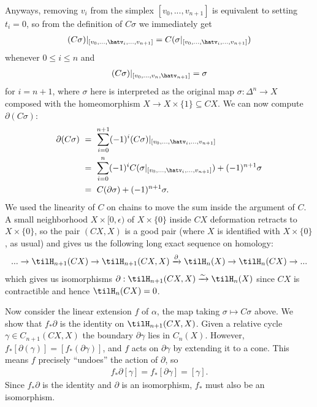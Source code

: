 \begin{homework}[e]
\begin{prf}
    Anyways, removing $v_i$ from the simplex $[v_0,...,v_{n+1}]$ is equivalent to setting $t_i = 0$, so from the definition of $C\sigma$ we immediately get
    \begin{align*}
      (C\sigma)|_{[v_0,...,\hatv_i,...,v_{n+1}]} = C(\sigma|_{[v_0,...,\hatv_i,...,v_{n+1}]})
    \end{align*}
    whenever $0\leq i\leq n$ and
    \begin{align*}
      (C\sigma)|_{[v_0,...,v_n,\hatv_{n+1}]} = \sigma
    \end{align*}
    for $i = n+1$, where $\sigma$ here is interpreted as the original map $\sigma:\Delta^n\to X$ composed with the homeomorphism $X \to X\times \{1\}\subseteq CX$. We can now compute $\partial (C\sigma)$:
    \begin{align*}
      \partial(C\sigma) &~=~ \sum_{i=0}^{n+1}(-1)^i(C\sigma)|_{[v_0,...,\hatv_i,...,v_{n+1}]} \\
                        &~=~\sum_{i=0}^{n} (-1)^iC(\sigma|_{[v_0,...,\hatv_i,...,v_{n+1}]}) + (-1)^{n+1}\sigma \\
                        &~=~ C(\partial \sigma) + (-1)^{n+1}\sigma.
    \end{align*}
    We used the linearity of $C$ on chains to move the sum inside the argument of $C$. A small neighborhood $X \times [0,\epsilon)$ of $X\times \{0\}$ inside $CX$ deformation retracts to $X\times \{0\}$, so the pair $(CX,X)$ is a good pair (where $X$ is identified with $X\times \{0\}$, as usual) and gives us the following long exact sequence on homology:
    \begin{align*}
      ...\to \tilH_{n+1}(CX) \to \tilH_{n+1}(CX,X) \xrightarrow{\partial}\tilH_{n}(X) \to \tilH_n(CX) \to ...
    \end{align*}
    which gives us isomorphisms $\partial:\tilH_{n+1}(CX,X) \xrightarrow{\sim} \tilH_n(X)$ since $CX$ is contractible and hence $\tilH_n(CX) = 0$. 

    Now consider the linear extension $f$ of $\alpha$, the map taking $\sigma\mapsto C\sigma$ above. We show that $f_*\partial$ is the identity on $\tilH_{n+1}(CX,X)$. Given a relative cycle $\gamma \in C_{n+1}(CX,X)$ the boundary $\partial \gamma$ lies in $C_n(X)$. However, $f_*[\partial(\gamma)] = [f_*(\partial\gamma)]$, and $f$ acts on $\partial\gamma$ by extending it to a cone. This means $f$ precisely ``undoes'' the action of $\partial$, so
    \begin{align*}
      f_*\partial[\gamma] = f_*[\partial \gamma] = [\gamma].
    \end{align*}
    Since $f_*\partial$  is the identity and $\partial$ is an isomorphism, $f_*$ must also be an isomorphism.


\end{prf}
\end{homework}
